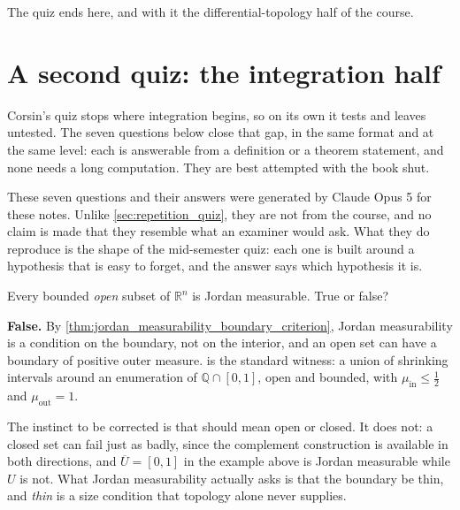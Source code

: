 The quiz ends here, and with it the differential-topology half of the course.

\section{A second quiz: the integration half}
\label{sec:repetition_quiz_integration}

Corsin's quiz stops where integration begins, so on its own it tests
 and leaves
 untested. The seven questions below close that gap, in
the same format and at the same level: each is answerable from a definition or a theorem
statement, and none needs a long computation. They are best attempted with the book shut.

\begin{ainote}
These seven questions and their answers were generated by Claude Opus 5 for these notes. Unlike
\cref{sec:repetition_quiz}, they are not from the course, and no claim is made that they resemble
what an examiner would ask. What they do reproduce is the shape of the mid-semester quiz: each one
is built around a hypothesis that is easy to forget, and the answer says which hypothesis it is.
\end{ainote}

\begin{question}
\label{q:quiz_q8}
Every bounded \emph{open} subset of $\mathbb{R}^n$ is Jordan measurable. True or false?
\end{question}

\begin{answer}
\textbf{False.} By \cref{thm:jordan_measurability_boundary_criterion}, Jordan measurability is a
condition on the boundary, not on the interior, and an open set can have a boundary of positive
outer measure.  is the standard witness: a union of
shrinking intervals around an enumeration of $\mathbb{Q}\cap[0,1]$, open and bounded, with
$\mu_{\mathrm{in}} \leq \tfrac12$ and $\mu_{\mathrm{out}} = 1$.
\end{answer}

\begin{ainote}
The instinct to be corrected is that  should mean open or closed. It does not: a closed
set can fail just as badly, since the complement construction is available in both directions,
and $\overline U = [0,1]$ in the example above is Jordan measurable while $U$ is not. What Jordan
measurability actually asks is that the boundary be thin, and \emph{thin} is a size condition
that topology alone never supplies.
\end{ainote}

